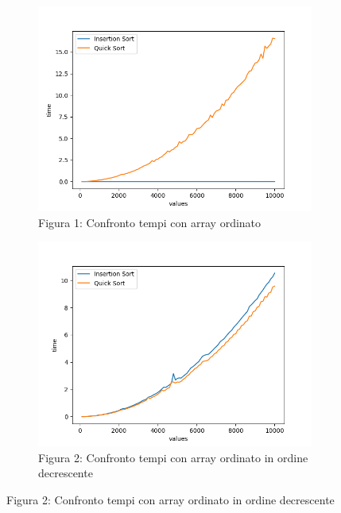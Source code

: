 \documentclass[
]{article}
\begin{document}
\begin{figure}[h!]
	\centering
	\centering
	\begin{subfigure}[b]{0.7\linewidth}
		\includegraphics{../img/ord/ord_comparison10000.png}
		\caption{Figura 1: Confronto tempi con array ordinato}
	\end{subfigure}
	\begin{subfigure}[b]{0.7\linewidth}
		\includegraphics{../img/ord_rev/ord_rev_comparison10000.png}
		\caption{Figura 2: Confronto tempi con array ordinato in ordine decrescente}
	\end{subfigure}

\end{figure}
\end{document}
